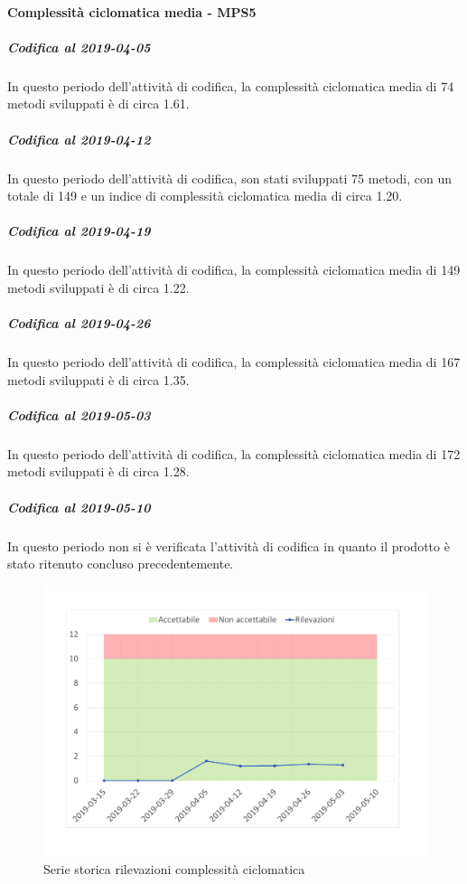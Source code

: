 \paragraph{Complessità ciclomatica media - MPS5}
\subparagraph{Codifica al 2019-04-05}
In questo periodo dell'attività di codifica, la complessità ciclomatica media di 74 metodi sviluppati è di circa 1.61. 

\subparagraph{Codifica al 2019-04-12}
In questo periodo dell'attività di codifica, son stati sviluppati 75 metodi, con un totale di 149 e un indice di complessità ciclomatica media di circa 1.20.

\subparagraph{Codifica al 2019-04-19}
In questo periodo dell'attività di codifica, la complessità ciclomatica media di 149 metodi sviluppati è di circa 1.22. 

\subparagraph{Codifica al 2019-04-26}
In questo periodo dell'attività di codifica, la complessità ciclomatica media di 167 metodi sviluppati è di circa 1.35. 

\subparagraph{Codifica al 2019-05-03}
In questo periodo dell'attività di codifica, la complessità ciclomatica media di 172 metodi sviluppati è di circa 1.28. 

\subparagraph{Codifica al 2019-05-10}
In questo periodo non si è verificata l'attività di codifica in quanto il prodotto è stato ritenuto concluso precedentemente.

\begin{figure}[H]
	\centering
	\includegraphics[scale=0.6]{images/resoconto/MPS5Chart.pdf}
	\caption{Serie storica rilevazioni complessità ciclomatica}	
\end{figure}


